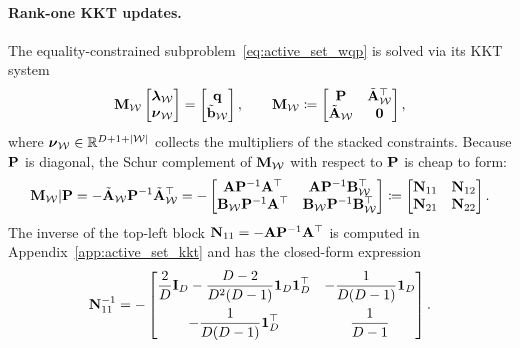 \paragraph{Rank-one KKT updates.} The equality-constrained subproblem~\eqref{eq:active_set_wqp} is solved via its KKT system
\begin{equation}\label{eq:as_kkt_main}
	\M_{\mathcal{W}}
	\begin{bmatrix}
		\lh_{\mathcal{W}} \\
		\boldsymbol{\nu}_{\mathcal{W}}
	\end{bmatrix}
	=
	\begin{bmatrix}
		\q \\
		\tilde{\b}_{\mathcal{W}}
	\end{bmatrix},
	\qquad
	\M_{\mathcal{W}}\coloneqq
	\begin{bmatrix}
		\P & \tilde{\A}_{\mathcal{W}}^\top \\
		\tilde{\A}_{\mathcal{W}} & \mathbf{0}
	\end{bmatrix},
\end{equation}
where $\boldsymbol{\nu}_{\mathcal{W}}\in\R^{D+1+|\mathcal{W}|}$ collects the multipliers of the stacked constraints. Because $\P$ is diagonal, the Schur complement of $\M_{\mathcal{W}}$ with respect to $\P$ is cheap to form:
\begin{equation}\label{eq:active_set_schur_comp_main}
	\M_{\mathcal{W}}|\P
	=
	-\tilde{\A}_{\mathcal{W}}\P^{-1}\tilde{\A}_{\mathcal{W}}^\top
	=
	-\begin{bmatrix}
		\A\P^{-1}\A^\top & \A\P^{-1}\B_{\mathcal{W}}^\top \\
		\B_{\mathcal{W}}\P^{-1}\A^\top & \B_{\mathcal{W}}\P^{-1}\B_{\mathcal{W}}^\top
	\end{bmatrix}\coloneqq
	\begin{bmatrix}
		\N_{11} & \N_{12} \\
		\N_{21} & \N_{22}
	\end{bmatrix}.
\end{equation}
The inverse of the top-left block $\N_{11}=-\A\P^{-1}\A^\top$ is computed in Appendix~\ref{app:active_set_kkt} and has the closed-form expression
\begin{equation}\label{eq:N11_inv_main}
	\N_{11}^{-1}
	=
	-\begin{bmatrix}
		\displaystyle\frac{2}{D}\I_D-\frac{D-2}{D^2(D-1)}\mathbf{1}_D\mathbf{1}_D^\top &
		\displaystyle-\frac{1}{D(D-1)}\mathbf{1}_D\\[10pt]
		\displaystyle-\frac{1}{D(D-1)}\mathbf{1}_D^\top &
		\displaystyle\frac{1}{D-1}
	\end{bmatrix}.
\end{equation}
